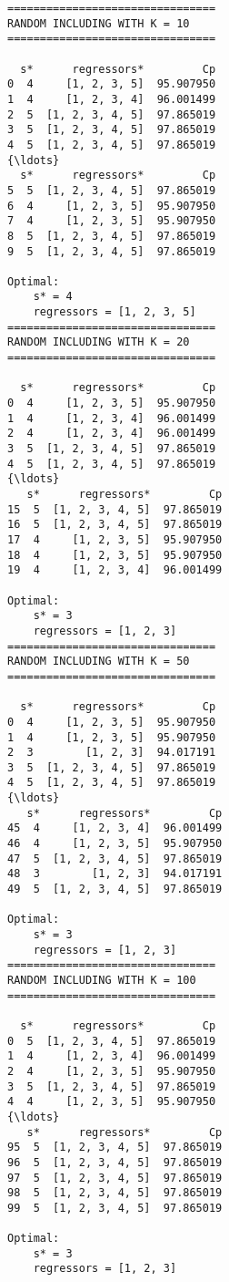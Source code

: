 \documentclass[11pt]{article}
\begin{document}
    \begin{Verbatim}[commandchars=\\\{\}]
================================
RANDOM INCLUDING WITH K = 10
================================

  s*      regressors*         Cp
0  4     [1, 2, 3, 5]  95.907950
1  4     [1, 2, 3, 4]  96.001499
2  5  [1, 2, 3, 4, 5]  97.865019
3  5  [1, 2, 3, 4, 5]  97.865019
4  5  [1, 2, 3, 4, 5]  97.865019
{\ldots}
  s*      regressors*         Cp
5  5  [1, 2, 3, 4, 5]  97.865019
6  4     [1, 2, 3, 5]  95.907950
7  4     [1, 2, 3, 5]  95.907950
8  5  [1, 2, 3, 4, 5]  97.865019
9  5  [1, 2, 3, 4, 5]  97.865019

Optimal:
	s* = 4
	regressors = [1, 2, 3, 5]
================================
RANDOM INCLUDING WITH K = 20
================================

  s*      regressors*         Cp
0  4     [1, 2, 3, 5]  95.907950
1  4     [1, 2, 3, 4]  96.001499
2  4     [1, 2, 3, 4]  96.001499
3  5  [1, 2, 3, 4, 5]  97.865019
4  5  [1, 2, 3, 4, 5]  97.865019
{\ldots}
   s*      regressors*         Cp
15  5  [1, 2, 3, 4, 5]  97.865019
16  5  [1, 2, 3, 4, 5]  97.865019
17  4     [1, 2, 3, 5]  95.907950
18  4     [1, 2, 3, 5]  95.907950
19  4     [1, 2, 3, 4]  96.001499

Optimal:
	s* = 3
	regressors = [1, 2, 3]
================================
RANDOM INCLUDING WITH K = 50
================================

  s*      regressors*         Cp
0  4     [1, 2, 3, 5]  95.907950
1  4     [1, 2, 3, 5]  95.907950
2  3        [1, 2, 3]  94.017191
3  5  [1, 2, 3, 4, 5]  97.865019
4  5  [1, 2, 3, 4, 5]  97.865019
{\ldots}
   s*      regressors*         Cp
45  4     [1, 2, 3, 4]  96.001499
46  4     [1, 2, 3, 5]  95.907950
47  5  [1, 2, 3, 4, 5]  97.865019
48  3        [1, 2, 3]  94.017191
49  5  [1, 2, 3, 4, 5]  97.865019

Optimal:
	s* = 3
	regressors = [1, 2, 3]
================================
RANDOM INCLUDING WITH K = 100
================================

  s*      regressors*         Cp
0  5  [1, 2, 3, 4, 5]  97.865019
1  4     [1, 2, 3, 4]  96.001499
2  4     [1, 2, 3, 5]  95.907950
3  5  [1, 2, 3, 4, 5]  97.865019
4  4     [1, 2, 3, 5]  95.907950
{\ldots}
   s*      regressors*         Cp
95  5  [1, 2, 3, 4, 5]  97.865019
96  5  [1, 2, 3, 4, 5]  97.865019
97  5  [1, 2, 3, 4, 5]  97.865019
98  5  [1, 2, 3, 4, 5]  97.865019
99  5  [1, 2, 3, 4, 5]  97.865019

Optimal:
	s* = 3
	regressors = [1, 2, 3]

    \end{Verbatim}
\end{document}
